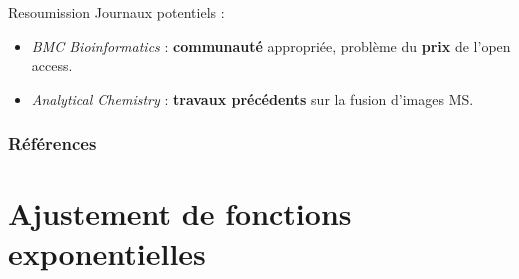 \documentclass[10pt]{beamer}
\begin{document}
\begin{frame}{Resoumission}
  Journaux potentiels :
  \begin{itemize}
  \item \textit{BMC Bioinformatics} : \textbf{communauté} appropriée, problème du \textbf{prix} de l'open access.
  \item \textit{Analytical Chemistry} : \textbf{travaux précédents} sur la fusion d'images MS.
  \end{itemize}
\end{frame}







\appendix
{}


\begin{frame}[allowframebreaks]
  \frametitle{Références}
  
  \scriptsize{
    
  }
\end{frame}

\section{Ajustement de fonctions exponentielles}
  

\end{document}
